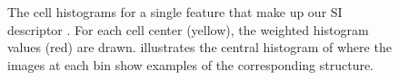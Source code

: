 \documentclass[thesis.tex]{subfiles}
\begin{document}
\begin{figure}[p]
\begin{subfigure}[t]{0.65\textwidth}
		\caption{}
		\label{fig:cellHistFigureSiChist}
   	\end{subfigure}
   	\caption{The cell histograms for a single feature that make up our SI descriptor . For each cell center (yellow), the weighted histogram values (red) are drawn.  illustrates the central histogram of  where the images at each bin show examples of the corresponding structure.}
    \label{fig:cellHistFigureSiC}
\end{figure}
%
\subbibliography
\end{document}
